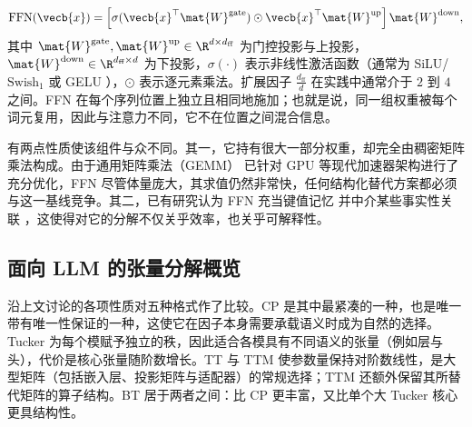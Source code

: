 \begin{equation}
\operatorname{FFN}(\vecb{x}) = \left[ \sigma(\vecb{x}^\top \mat{W}^{\text{gate}}) \odot \vecb{x}^\top \mat{W}^{\text{up}} \right] \mat{W}^{\text{down}},
\label{eq:ffn_gated}
\end{equation}
其中 $\mat{W}^{\text{gate}}, \mat{W}^{\text{up}} \in \R^{d \times d_{\text{ff}}}$ 为门控投影与上投影，$\mat{W}^{\text{down}} \in \R^{d_{\text{ff}} \times d}$ 为下投影，$\sigma(\cdot)$ 表示非线性激活函数（通常为 SiLU/$\text{Swish}_1$ \cite{ramachandran2017swish} 或 GELU \cite{hendrycks2023gelu}），$\odot$ 表示逐元素乘法。扩展因子 $\frac{d_{\text{ff}}}{d}$ 在实践中通常介于 $2$ 到 $4$ 之间。FFN 在每个序列位置上独立且相同地施加；也就是说，同一组权重被每个词元复用，因此与注意力不同，它不在位置之间混合信息。

有两点性质使该组件与众不同。其一，它持有很大一部分权重，却完全由稠密矩阵乘法构成。由于通用矩阵乘法（GEMM）\cite{goto2008anatomy} 已针对 GPU 等现代加速器架构进行了充分优化，FFN 尽管体量庞大，其求值仍然非常快，任何结构化替代方案都必须与这一基线竞争。其二，已有研究认为 FFN 充当键值记忆 \cite{geva2021ffnmemory} 并中介某些事实性关联 \cite{meng2023ffnfactuallocation}，这使得对它的分解不仅关乎效率，也关乎可解释性。


\subsection{面向 LLM 的张量分解概览}

 沿上文讨论的各项性质对五种格式作了比较。CP 是其中最紧凑的一种，也是唯一带有唯一性保证的一种，这使它在因子本身需要承载语义时成为自然的选择。Tucker 为每个模赋予独立的秩，因此适合各模具有不同语义的张量（例如层与头），代价是核心张量随阶数增长。TT 与 TTM 使参数量保持对阶数线性，是大型矩阵（包括嵌入层、投影矩阵与适配器）的常规选择；TTM 还额外保留其所替代矩阵的算子结构。BT 居于两者之间：比 CP 更丰富，又比单个大 Tucker 核心更具结构性。


